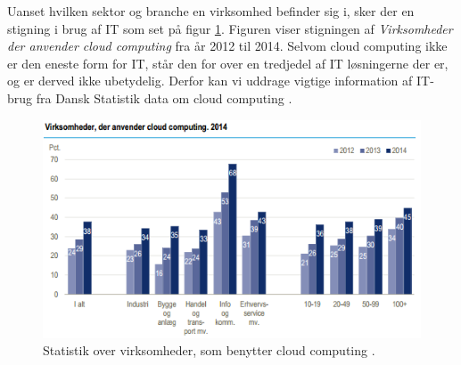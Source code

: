 Uanset hvilken sektor og branche en virksomhed befinder sig i, sker der en stigning i brug af IT som set på figur \ref{fig:virksomcc}. Figuren viser stigningen af \textit{Virksomheder der anvender cloud computing} fra år 2012 til 2014. Selvom cloud computing ikke er den eneste form for IT, står den for over en tredjedel af IT løsningerne der er, og er derved ikke ubetydelig. Derfor kan vi uddrage vigtige information af IT-brug fra Dansk Statistik data om cloud computing \citep{itvirk}. 
\begin{figure}
    \centering
    \includegraphics[width=1\textwidth]{figures/virksomhederderanvendercc.png}
    \caption{Statistik over virksomheder, som benytter cloud computing \citep{itvirk}.} 
    \label{fig:virksomcc}
\end{figure} \\

